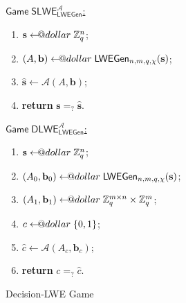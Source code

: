 \documentclass{template}
\makeatletter
\newcommand\leftarrowS{\leftarrow\joinrel\smalldollar}
\newcommand{\smalldollar}{\mathrel{\mathpalette\small@dollar\relax}}
\newcommand{\small@dollar}[2]{%
  \vcenter{\hbox{%
    $#1\textnormal{\fontsize{0.7\dimexpr\f@size pt}{0}\selectfont\$}$%
  }}%
}
\makeatother
\begin{document}
\begin{figure}[ht]
    \centering
    \begin{minipage}{0.45\linewidth}
        \begin{mdframed}[linecolor=black, linewidth=1pt,
                         skipabove=10pt, skipbelow=10pt]
        \colorbox{green!10}{\underline{$\mathsf{Game} \; \mathsf{SLWE}_{\mathsf{LWEGen}}^{\mathcal{A}}$:}}
        \begin{enumerate}
            \item $\mathbf{s} \leftarrowS \mathbb{Z}_q^{n}$;
            \item $(A,\mathbf{b}) \leftarrowS \mathsf{LWEGen}_{n,m,q,\chi}(\mathbf{s})$;
            \item $\widehat{\mathbf{s}} \gets \mathcal{A}(A,\mathbf{b})$;
            \item \textbf{return} $\mathbf{s} =_? \widehat{\mathbf{s}}$.
        \end{enumerate}
        \end{mdframed}
        \caption{Search-LWE Game} 
        \label{fig:search-lwe}
    \end{minipage}
    \hfill
    \begin{minipage}{0.45\linewidth}
        \begin{mdframed}[linecolor=black, linewidth=1pt,
                         skipabove=10pt, skipbelow=10pt]
        \colorbox{green!10}{\underline{$\mathsf{Game} \; \mathsf{DLWE}_{\mathsf{LWEGen}}^{\mathcal{A}}$:}}
        \begin{enumerate}
            \item $\mathbf{s} \leftarrowS \mathbb{Z}_q^{n}$;
            \item $(A_0,\mathbf{b}_0) \leftarrowS \mathsf{LWEGen}_{n,m,q,\chi}(\mathbf{s})$;
            \item $(A_1,\mathbf{b}_1) \leftarrowS \mathbb{Z}_q^{m \times n} \times \mathbb{Z}_q^m$;
            \item $c \leftarrowS \{0,1\}$;
            \item $\widehat{c} \gets \mathcal{A}(A_c,\mathbf{b}_c)$;
            \item \textbf{return} $c =_? \widehat{c}$.
        \end{enumerate}
        \end{mdframed}
        \caption{Decision-LWE Game}
        \label{fig:decision-lwe}
    \end{minipage}
\end{figure}
\end{document}
